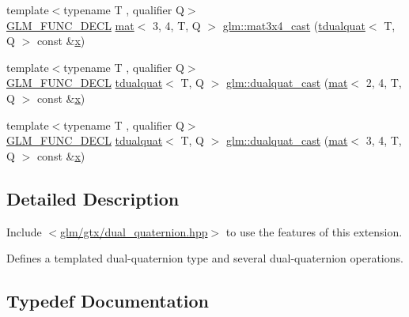 \begin{DoxyCompactItemize}
\item 
{\footnotesize template$<$typename T , qualifier Q$>$ }\\\mbox{\hyperlink{setup_8hpp_ab2d052de21a70539923e9bcbf6e83a51}{G\+L\+M\+\_\+\+F\+U\+N\+C\+\_\+\+D\+E\+CL}} \mbox{\hyperlink{structglm_1_1mat}{mat}}$<$ 3, 4, T, Q $>$ \mbox{\hyperlink{group__gtx__dual__quaternion_gaf59f5bb69620d2891c3795c6f2639179}{glm\+::mat3x4\+\_\+cast}} (\mbox{\hyperlink{structglm_1_1tdualquat}{tdualquat}}$<$ T, Q $>$ const \&\mbox{\hyperlink{_s_d_l__opengl_8h_ad0e63d0edcdbd3d79554076bf309fd47}{x}})
\item 
{\footnotesize template$<$typename T , qualifier Q$>$ }\\\mbox{\hyperlink{setup_8hpp_ab2d052de21a70539923e9bcbf6e83a51}{G\+L\+M\+\_\+\+F\+U\+N\+C\+\_\+\+D\+E\+CL}} \mbox{\hyperlink{structglm_1_1tdualquat}{tdualquat}}$<$ T, Q $>$ \mbox{\hyperlink{group__gtx__dual__quaternion_gac4064ff813759740201765350eac4236}{glm\+::dualquat\+\_\+cast}} (\mbox{\hyperlink{structglm_1_1mat}{mat}}$<$ 2, 4, T, Q $>$ const \&\mbox{\hyperlink{_s_d_l__opengl_8h_ad0e63d0edcdbd3d79554076bf309fd47}{x}})
\item 
{\footnotesize template$<$typename T , qualifier Q$>$ }\\\mbox{\hyperlink{setup_8hpp_ab2d052de21a70539923e9bcbf6e83a51}{G\+L\+M\+\_\+\+F\+U\+N\+C\+\_\+\+D\+E\+CL}} \mbox{\hyperlink{structglm_1_1tdualquat}{tdualquat}}$<$ T, Q $>$ \mbox{\hyperlink{group__gtx__dual__quaternion_ga91025ebdca0f4ea54da08497b00e8c84}{glm\+::dualquat\+\_\+cast}} (\mbox{\hyperlink{structglm_1_1mat}{mat}}$<$ 3, 4, T, Q $>$ const \&\mbox{\hyperlink{_s_d_l__opengl_8h_ad0e63d0edcdbd3d79554076bf309fd47}{x}})
\end{DoxyCompactItemize}


\subsection{Detailed Description}
Include $<$\mbox{\hyperlink{dual__quaternion_8hpp}{glm/gtx/dual\+\_\+quaternion.\+hpp}}$>$ to use the features of this extension.

Defines a templated dual-\/quaternion type and several dual-\/quaternion operations. 

\subsection{Typedef Documentation}
\mbox{\label{group__gtx__dual__quaternion_ga373431ffdd82d5c03c258217a9e1f1a6}} 
